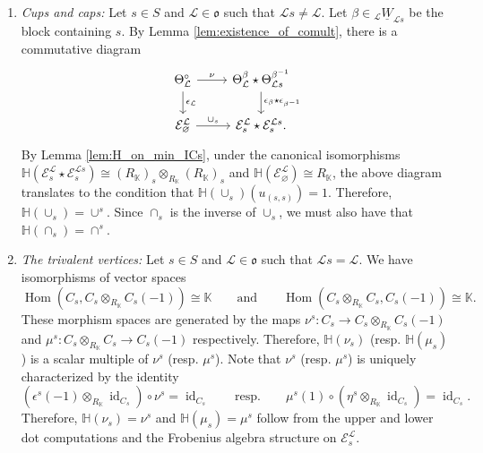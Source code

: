 \documentclass{amsart}
\newcommand{\K}{\mathbb{K}}
\renewcommand{\H}{\mathbb{H}}
\newcommand{\scrE}{\mathcal{E}}
\newcommand{\scrL}{\mathcal{L}}
\DeclareMathOperator{\Hom}{Hom}
\DeclareMathOperator{\id}{id}
\newcommand{\fr}[1]{\mathfrak{#1}}
\newcommand{\uW}[2]{{}_{#1}\underline{W}_{#2}}
\renewcommand{\emptyset}{\varnothing}
\theoremstyle{definition}
\numberwithin{equation}{subsection}
\begin{document}
\begin{enumerate}
            is given by $\lambda \cdot \id_{\scrL [-1]}$.
            After applying $(-) \otimes^L \scrL^{-1}$ to (\ref{eq:lower_dot_reln_1}), we see that the natural morphism of $T\times T$-equivariant sheaves
            \[
              \underline{\K}_{T} [-1] = j^! \underline{\K}_{L_s} [1] \to j^* \underline{\K}_{L_s} [1] = \underline{\K}_T [1]
            \]
            is also given by $\lambda \cdot \id_{\underline{\K}_T [-1]}$. It then follows from the non-monodromic case (cf., \cite[\S10.5]{RW}) that $\lambda = \alpha_s$, and as a result, $\H (\epsilon_s \circ \eta_s) = \alpha_s$.
            Note that $\eta^s$ is uniquely determined by $\epsilon^s \circ \eta^s = \alpha_s$. As a consequence, we deduce from the upper dot computation that $\H (\eta_s) = \eta^s$. 
    \item \emph{Cups and caps:} Let $s \in S$ and $\scrL \in \fr{o}$ such that $\scrL s \neq \scrL$. Let $\beta \in \uW{\scrL}{\scrL s}$ be the block containing $s$.
            By Lemma \ref{lem:existence_of_comult}, there is a commutative diagram
            \[\begin{tikzcd}
                \Theta_{\scrL}^{\circ}  \arrow[d, "\epsilon_{\scrL}"] \arrow[r, "\nu"] & \Theta_{\scrL}^{\beta} \star \Theta_{\scrL s}^{\beta^{-1}} \arrow[d, "\epsilon_{\beta} \star \epsilon_{\beta^{-1}}"] \\
                \scrE_{\emptyset}^{\scrL} \arrow[r, "\cup_s"]                          & \scrE_s^{\scrL} \star \scrE_s^{\scrL s}.                                                                          
                \end{tikzcd}\]
                By Lemma \ref{lem:H_on_min_ICs}, under the canonical isomorphisms $\H (\scrE_s^{\scrL} \star \scrE_s^{\scrL s}) \cong (R_{\K})_s \otimes_{R_{\K}} (R_{\K})_s$ and $\H (\scrE_{\emptyset}^{\scrL}) \cong R_{\K}$, the above diagram translates to the condition that $\H (\cup_s) (u_{(s,s)}) = 1$.
                Therefore, $\H (\cup_s) = \cup^s$. Since $\cap_s$ is the inverse of $\cup_s$, we must also have that $\H (\cap_s) = \cap^s$.
    \item \emph{The trivalent vertices: } Let $s \in S$ and $\scrL \in \fr{o}$ such that $\scrL s = \scrL$. We have isomorphisms of vector spaces
        \[\Hom (C_s, C_s \otimes_{R_{\K}} C_s (-1)) \cong \K \qquad\text{and}\qquad \Hom (C_s \otimes_{R_{\K}} C_s, C_s (-1)) \cong \K.\]
        These morphism spaces are generated by the maps $\nu^s : C_s \to C_s \otimes_{R_{\K}} C_s (-1)$ and $\mu^s : C_s \otimes_{R_{\K}} C_s \to C_s (-1)$ respectively. Therefore, $\H (\nu_s)$ (resp. $\H (\mu_s)$) is a scalar multiple of $\nu^s$ (resp. $\mu^s$). 
        Note that $\nu^s$ (resp. $\mu^s$) is uniquely characterized by the identity
        \[(\epsilon^s (-1) \otimes_{R_{\K}} \id_{C_s}) \circ \nu^s = \id_{C_s} \qquad \text{resp.} \qquad \mu^s (1) \circ (\eta^s \otimes_{R_{\K}} \id_{C_s}) = \id_{C_s}.\]
        Therefore, $\H (\nu_s) = \nu^s$ and $\H (\mu_s) = \mu^s$ follow from the upper and lower dot computations and the Frobenius algebra structure on $\scrE_s^{\scrL}$.
    \end{enumerate}
\end{document}
